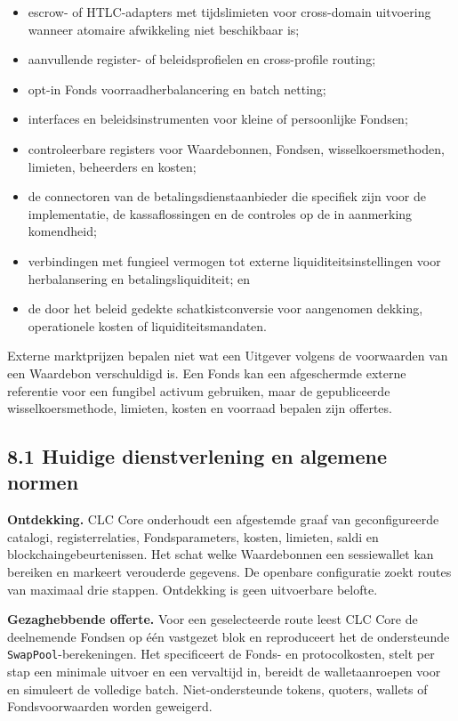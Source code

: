 \documentclass[11pt]{article}
\begin{document}
\begin{itemize}[leftmargin=*]
\item escrow- of HTLC-adapters met tijdslimieten voor cross-domain uitvoering wanneer atomaire afwikkeling niet beschikbaar is;
\item aanvullende register- of beleidsprofielen en cross-profile routing;
\item opt-in Fonds voorraadherbalancering en batch netting;
\item interfaces en beleidsinstrumenten voor kleine of persoonlijke Fondsen;
\item controleerbare registers voor Waardebonnen, Fondsen, wisselkoersmethoden, limieten, beheerders en kosten;
\item de connectoren van de betalingsdienstaanbieder die specifiek zijn voor de implementatie, de kassaflossingen en de controles op de in aanmerking komendheid;
\item verbindingen met fungieel vermogen tot externe liquiditeitsinstellingen voor herbalansering en betalingsliquiditeit; en
\item de door het beleid gedekte schatkistconversie voor aangenomen dekking, operationele kosten of liquiditeitsmandaten.
\end{itemize}
Externe marktprijzen bepalen niet wat een Uitgever volgens de voorwaarden van een Waardebon verschuldigd is. Een Fonds kan een afgeschermde externe referentie voor een fungibel activum gebruiken, maar de gepubliceerde wisselkoersmethode, limieten, kosten en voorraad bepalen zijn offertes.

\subsection*{8.1 Huidige dienstverlening en algemene normen}

\textbf{Ontdekking.} CLC Core onderhoudt een afgestemde graaf van geconfigureerde catalogi, registerrelaties, Fondsparameters, kosten, limieten, saldi en blockchaingebeurtenissen. Het schat welke Waardebonnen een sessiewallet kan bereiken en markeert verouderde gegevens. De openbare configuratie zoekt routes van maximaal drie stappen. Ontdekking is geen uitvoerbare belofte.

\textbf{Gezaghebbende offerte.} Voor een geselecteerde route leest CLC Core de deelnemende Fondsen op één vastgezet blok en reproduceert het de ondersteunde \texttt{SwapPool}-berekeningen. Het specificeert de Fonds- en protocolkosten, stelt per stap een minimale uitvoer en een vervaltijd in, bereidt de walletaanroepen voor en simuleert de volledige batch. Niet-ondersteunde tokens, quoters, wallets of Fondsvoorwaarden worden geweigerd.
\end{document}
